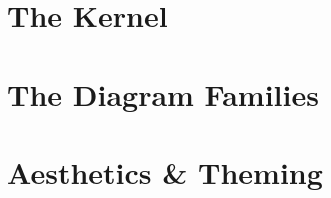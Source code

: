 \documentclass{MastersThesis}
\begin{document}

\part{The Kernel}
\label{part:kernel}







\part{The Diagram Families}
\label{part:families}



\part{Aesthetics \& Theming}
\label{part:aesthetics}


\end{document}
